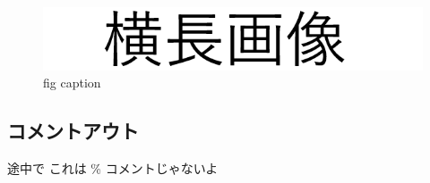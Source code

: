 \documentclass[a4paper,11pt]{jarticle}
\begin{document}
        \begin{figure}[h]
            \centering
            \includegraphics{zzz.png}
            \caption{fig caption}
            \label{fig:figure}
        \end{figure}

        \subsection*{コメントアウト}
            途中で %
            これは \% コメントじゃないよ
\end{document}
